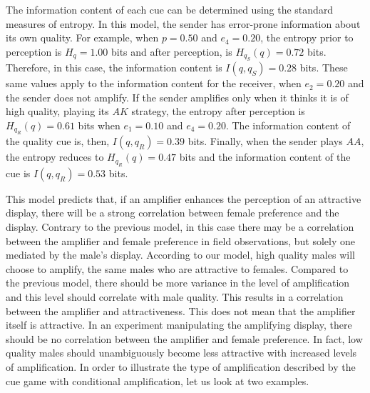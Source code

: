 \documentclass[a4paper,12pt]{article}
\numberwithin{equation}{section}
\begin{document}
The information content of each cue can be determined using the standard measures of entropy. In this model, the sender has error-prone information about its own quality. For example, when $p = 0.50$ and $e_{4} = 0.20$, the entropy prior to perception is $H_{q} = 1.00$ bits and after perception, is $H_{q_{S}}(q) = 0.72$ bits. Therefore, in this case, the information content is $I(q, q_{S}) = 0.28$ bits. These same values apply to the information content for the receiver, when $e_{2} = 0.20$ and the sender does not amplify. If the sender amplifies only when it thinks it is of high quality, playing its $AK$ strategy, the entropy after perception is $H_{q_{R}}(q) = 0.61$ bits when $e_{1} = 0.10$ and $e_{4} = 0.20$. The information content of the quality cue is, then, $I(q, q_{R}) = 0.39$ bits. Finally, when the sender plays $AA$, the entropy reduces to $H_{q_{R}}(q) = 0.47$ bits and the information content of the cue is $I(q, q_{R}) = 0.53$ bits.

This model predicts that, if an amplifier enhances the perception of an attractive display, there will be a strong correlation between female preference and the display. Contrary to the previous model, in this case there may be a correlation between the amplifier and female preference in field observations, but solely one mediated by the male's display. According to our model, high quality males will choose to amplify, the same males who are attractive to females. Compared to the previous model, there should be more variance in the level of amplification and this level should correlate with male quality. This results in a correlation between the amplifier and attractiveness. This does not mean that the amplifier itself is attractive. In an experiment manipulating the amplifying display, there should be no correlation between the amplifier and female preference. In fact, low quality males should unambiguously become less attractive with increased levels of amplification. In order to illustrate the type of amplification described by the cue game with conditional amplification, let us look at two examples.
\end{document}
